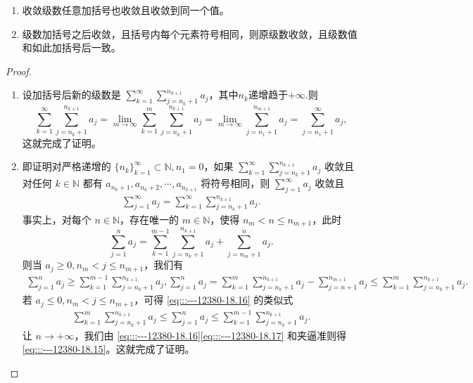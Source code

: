 \documentclass[../../main.tex]{subfiles}
\begin{document}
\begin{theorem}[级数加括号的理解]\label{theorem:级数加括号的理解}
\begin{enumerate}
\item 收敛级数任意加括号也收敛且收敛到同一个值。

\item 级数加括号之后收敛，且括号内每个元素符号相同，则原级数收敛，且级数值和如此加括号后一致。
\end{enumerate}
\end{theorem}
\begin{proof}
\begin{enumerate}
\item 设加括号后新的级数是 \( \sum_{k = 1}^{\infty} \sum_{j = n_k + 1}^{n_{k + 1}} a_j \)，其中$n_k$递增趋于$+\infty.$则
\[
\sum_{k = 1}^{\infty} \sum_{j = n_k + 1}^{n_{k + 1}} a_j = \lim_{m \to \infty} \sum_{k = 1}^{m} \sum_{j = n_k + 1}^{n_{k + 1}} a_j = \lim_{m \to \infty} \sum_{j = n_1 + 1}^{n_{m + 1}} a_j = \sum_{j = n_1 + 1}^{\infty} a_j,
\]
这就完成了证明。

\item 即证明对严格递增的 \( \{n_k\}_{k = 1}^{\infty} \subset \mathbb{N}, n_1 = 0 \)，如果 \( \sum_{k = 1}^{\infty} \sum_{j = n_k + 1}^{n_{k + 1}} a_j \) 收敛且对任何 \( k \in \mathbb{N} \) 都有 \( a_{n_k + 1}, a_{n_k + 2}, \cdots, a_{n_{k + 1}} \) 将符号相同，则 \( \sum_{j = 1}^{\infty} a_j \) 收敛且
\begin{align}
\sum_{j = 1}^{\infty} a_j = \sum_{k = 1}^{\infty} \sum_{j = n_k + 1}^{n_{k + 1}} a_j. \label{eq:::---12380-18.15}
\end{align}
事实上，对每个 \( n \in \mathbb{N} \)，存在唯一的 \( m \in \mathbb{N} \)，使得 \( n_m < n \leqslant n_{m + 1} \)，此时
\[
\sum_{j = 1}^{n} a_j = \sum_{k = 1}^{m - 1} \sum_{j = n_k + 1}^{n_{k + 1}} a_j + \sum_{j = n_m + 1}^{n} a_j.
\]
则当 \( a_j \geqslant 0, n_m < j \leqslant n_{m + 1} \)，我们有
\begin{align}
\sum_{j = 1}^{n} a_j \geqslant \sum_{k = 1}^{m - 1} \sum_{j = n_k + 1}^{n_{k + 1}} a_j, \sum_{j = 1}^{n} a_j = \sum_{k = 1}^{m} \sum_{j = n_k + 1}^{n_{k + 1}} a_j - \sum_{j = n + 1}^{n_{m + 1}} a_j \leqslant \sum_{k = 1}^{m} \sum_{j = n_k + 1}^{n_{k + 1}} a_j. \label{eq:::---12380-18.16}
\end{align}
若 \( a_j \leqslant 0, n_m < j \leqslant n_{m + 1} \)，可得 \eqref{eq:::---12380-18.16} 的类似式
\begin{align}
\sum_{k = 1}^{m} \sum_{j = n_k + 1}^{n_{k + 1}} a_j \leqslant \sum_{j = 1}^{n} a_j \leqslant \sum_{k = 1}^{m - 1} \sum_{j = n_k + 1}^{n_{k + 1}} a_j. \label{eq:::---12380-18.17}
\end{align}
让 \( n \to +\infty \)，我们由 \eqref{eq:::---12380-18.16}\eqref{eq:::---12380-18.17} 和夹逼准则得 \eqref{eq:::---12380-18.15}。这就完成了证明。
\end{enumerate}

\end{proof}
\end{document}
